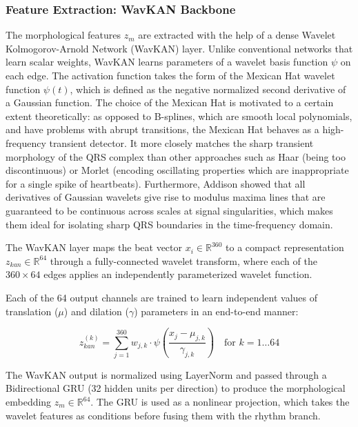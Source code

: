 \documentclass[journal]{IEEEtran}
\begin{document}
\subsubsection{Feature Extraction: WavKAN Backbone}
The morphological features $z_m$ are extracted with the help of a dense Wavelet Kolmogorov-Arnold Network (WavKAN) layer. Unlike conventional networks that learn scalar weights, WavKAN learns parameters of a wavelet basis function $\psi$ on each edge. The activation function takes the form of the Mexican Hat wavelet function $\psi(t)$, which is defined as the negative normalized second derivative of a Gaussian function. The choice of the Mexican Hat is motivated to a certain extent theoretically: as opposed to B-splines, which are smooth local polynomials, and have problems with abrupt transitions, the Mexican Hat behaves as a high-frequency transient detector. It more closely matches the sharp transient morphology of the QRS complex than other approaches such as Haar (being too discontinuous) or Morlet (encoding oscillating properties which are inappropriate for a single spike of heartbeats). Furthermore, Addison \cite{addison_wavelet_2005} showed that all derivatives of Gaussian wavelets give rise to modulus maxima lines that are guaranteed to be continuous across scales at signal singularities, which makes them ideal for isolating sharp QRS boundaries in the time-frequency domain.

The WavKAN layer maps the beat vector $x_i \in \mathbb{R}^{360}$ to a compact representation $z_{kan} \in \mathbb{R}^{64}$ through a fully-connected wavelet transform, where each of the $360 \times 64$ edges applies an independently parameterized wavelet function.

Each of the 64 output channels are trained to learn independent values of translation ($\mu$) and dilation ($\gamma$) parameters in an end-to-end manner:

\begin{equation}
z_{kan}^{(k)} = \sum_{j=1}^{360} w_{j,k} \cdot \psi\left(\frac{x_j - \mu_{j,k}}{\gamma_{j,k}}\right) \quad \text{for } k=1 \dots 64
\end{equation}

The WavKAN output is normalized using LayerNorm and passed through a Bidirectional GRU (32 hidden units per direction) \cite{zhao_mak-net_2025, mousavi_inter-_2019} to produce the morphological embedding $z_m \in \mathbb{R}^{64}$. The GRU is used as a nonlinear projection, which takes the wavelet features as conditions before fusing them with the rhythm branch.
\end{document}
